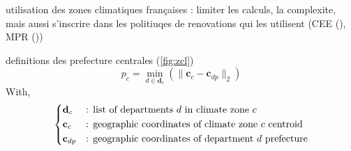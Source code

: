 \documentclass[11pt]{article}
\begin{document}
        utilisation des zones climatiques françaises : limiter les calculs, la complexite, mais aussi s'inscrire dans les politiuqes de renovations qui les utilisent (CEE (\cite{ademe_french_2011}), MPR (\cite{anah_aides_2024}))

        definitions des prefecture centrales (\ref{fig:zcl})
        \begin{equation}
            \label{eq:pref_centr}
            p_c = \min_{d \in \mathbf{d}_c} \left(\|\mathbf{c}_c - \mathbf{c}_{dp}\|_2 \right)
        \end{equation}
        With,
        $$
        \begin{dcases}
            \mathbf{d}_c&\text{: list of departments $d$ in climate zone $c$}\\
            \mathbf{c}_c&\text{: geographic coordinates of climate zone $c$ centroid}\\
            \mathbf{c}_{dp}&\text{: geographic coordinates of department $d$ prefecture}\\
        \end{dcases}
        $$
\end{document}
